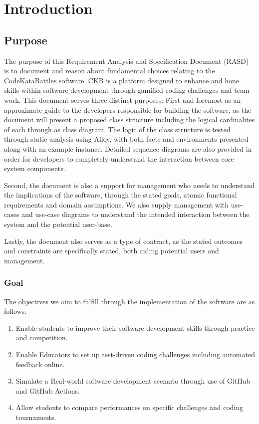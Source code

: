\section{Introduction}
\label{sec:intro}


\subsection{Purpose}
The purpose of this Requirement Analysis and Specification Document (RASD) is to document and reason about fundamental choices relating to the CodeKataBattles software. CKB is a platform designed to enhance and hone skills within software development through gamified coding challenges and team work. This document serves three distinct purposes: First and foremost as an approximate guide to the developers responsible for building the software, as the document will present a proposed class structure including the logical cardinalites of each through as class diagram. The logic of the class structure is tested through static analysis using Alloy, with both facts and environments presented along with an example instance. Detailed sequence diagrams are also provided in order for developers to completely understand the interaction between core system components. 

Second, the document is also a support for management who needs to understand the implications of the software, through the stated goals, atomic functional requirements and domain assumptions. We also supply management with use-cases and use-case diagrams to understand the intended interaction between the system and the potential user-base. 

Lastly, the document also serves as a type of contract, as the stated outcomes and constraints are specifically stated, both aiding potential users and management. 





\subsubsection{Goal}
The objectives we aim to fulfill through the implementation of the software are as follows.
\begin{enumerate}
    \item Enable students to improve their software development skills through practice and competition.
    \item Enable Educators to set up test-driven coding challenges including automated feedback online. 
    \item Simulate a Real-world software development scenario through use of GitHub and GitHub Actions. 
    \item Allow students to compare performances on specific challenges and coding tournaments. 
\end{enumerate}

